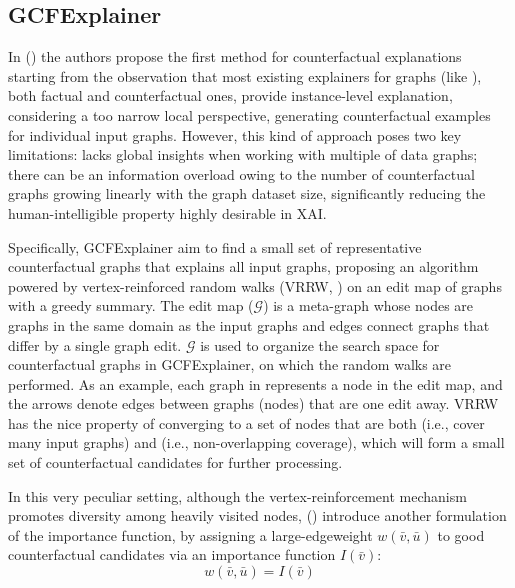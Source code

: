 \documentclass[binding=0.6cm]{sapthesis}
\newcommand{\mycite}[1]{(\cite{#1})}
\begin{document}
\subsection{GCFExplainer}
\label{sec:cfpg.bg.globalCF}
In \mycite{huang2023-globalCF} the authors propose the first method for  counterfactual explanations starting from the observation that most existing explainers for graphs (like \cite{vu2020-pgm-explainer,ying2019-gnnexplainer,yuan2020-xgnn}), both factual and counterfactual ones, provide instance-level explanation, considering a too narrow local perspective, generating counterfactual examples for individual input graphs. However, this kind of approach poses two key limitations: lacks global insights when working with multiple of data graphs; there can be an information overload owing to the number of counterfactual graphs growing linearly with the graph dataset size, significantly reducing the human-intelligible property highly desirable in XAI. 

Specifically, GCFExplainer aim to find a small set of representative counterfactual graphs that explains all input graphs, proposing an algorithm powered by vertex-reinforced random walks (VRRW, \cite{pemantle2004-vertexreinforced}) on an edit map of graphs with a greedy summary. The edit map ($\mathcal{G}$) is a meta-graph whose nodes are graphs in the same domain as the input graphs and edges connect graphs that differ by a single graph edit. $\mathcal{G}$ is used to organize the search space for counterfactual graphs in GCFExplainer, on which the random walks are performed. As an example, each graph in represents a node in the edit map, and the arrows denote edges between graphs (nodes) that are one edit away. VRRW has the nice property of converging to a set of nodes that are both  (i.e., cover many input graphs) and  (i.e., non-overlapping coverage), which will form a small set of counterfactual candidates for further processing.

In this very peculiar setting, although the vertex-reinforcement mechanism promotes diversity among heavily visited nodes, \mycite{huang2023-globalCF} introduce another formulation of the importance function, by assigning a large-edge\footnotemark weight $w(\bar{v},\bar{u})$ to good counterfactual candidates via an importance function $I(\bar{v})$:
\begin{equation}
    w(\bar{v},\bar{u}) = I(\bar{v})
\end{equation}
\end{document}
